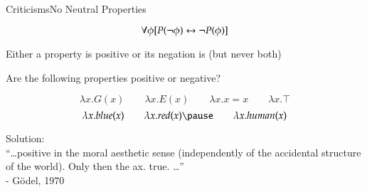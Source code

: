 \begin{frame}{Criticisms}{No Neutral Properties} \centering

$$\forall \phi [P(\neg \phi) \leftrightarrow \neg P(\phi)]$$

Either a property is positive or its negation is (but never both)
		  
\pause
\bigskip

Are the following properties positive or negative?

$$
\lambda x. G(x) \qquad \lambda x. E(x) \qquad \lambda x. x = x  \qquad  \lambda x. \top
$$
\pause
$$
\lambda x. blue(x) \qquad \lambda x. red(x) \pause \qquad \lambda x. human(x)
$$



\pause
\bigskip

Solution: \\
``\ldots positive in the moral aesthetic sense (independently of the accidental structure of the world). Only then the ax. true. \ldots''
\\ \hfill - G\"odel, 1970
\end{frame}


